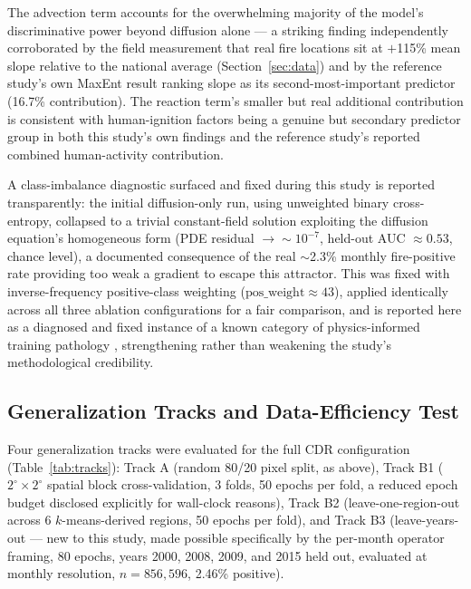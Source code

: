 \documentclass[journal]{IEEEtran}
\begin{document}
The advection term accounts for the overwhelming majority of the model's discriminative power beyond diffusion alone --- a striking finding independently corroborated by the field measurement that real fire locations sit at $+$115\% mean slope relative to the national average (Section~\ref{sec:data}) and by the reference study's own MaxEnt result ranking slope as its second-most-important predictor (16.7\% contribution). The reaction term's smaller but real additional contribution is consistent with human-ignition factors being a genuine but secondary predictor group in both this study's own findings and the reference study's reported combined human-activity contribution.

A class-imbalance diagnostic surfaced and fixed during this study is reported transparently: the initial diffusion-only run, using unweighted binary cross-entropy, collapsed to a trivial constant-field solution exploiting the diffusion equation's homogeneous form (PDE residual $\to \sim10^{-7}$, held-out AUC $\approx0.53$, chance level), a documented consequence of the real $\sim$2.3\% monthly fire-positive rate providing too weak a gradient to escape this attractor. This was fixed with inverse-frequency positive-class weighting ($\mathrm{pos\_weight}\approx43$), applied identically across all three ablation configurations for a fair comparison, and is reported here as a diagnosed and fixed instance of a known category of physics-informed training pathology \cite{wang2021gradient}, strengthening rather than weakening the study's methodological credibility.

\subsection{Generalization Tracks and Data-Efficiency Test}

Four generalization tracks were evaluated for the full CDR configuration (Table~\ref{tab:tracks}): Track A (random 80/20 pixel split, as above), Track B1 ($2^{\circ}\times2^{\circ}$ spatial block cross-validation, 3 folds, 50 epochs per fold, a reduced epoch budget disclosed explicitly for wall-clock reasons), Track B2 (leave-one-region-out across 6 $k$-means-derived regions, 50 epochs per fold), and Track B3 (leave-years-out --- new to this study, made possible specifically by the per-month operator framing, 80 epochs, years 2000, 2008, 2009, and 2015 held out, evaluated at monthly resolution, $n=856{,}596$, 2.46\% positive).
\end{document}
